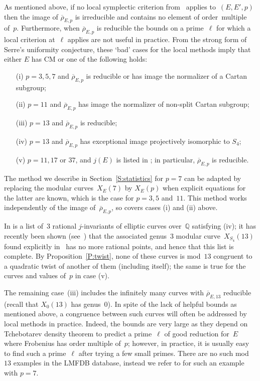 \documentclass[12pt]{amsart}
\newcommand{\Q}{\mathbb{Q}}
\newcommand{\rhobar}{{\overline{\rho}}}
\numberwithin{equation}{section}
\theoremstyle{definition}
\theoremstyle{remark}
\begin{document}

As mentioned above, if no local
symplectic criterion from~\cite{FKSym} applies to~$(E,E',p)$ then the image of $\rhobar_{E,p}$ is irreducible and contains no element of order~multiple of~$p$. Furthermore, 
when $\rhobar_{E,p}$ is reducible the bounds
on a prime~$\ell$ for which a local criterion at~$\ell$ 
applies are not useful in practice.
From the strong form of Serre's uniformity conjecture, these `bad' cases for the local methods imply that either $E$ has CM 
or one of the following holds:
\begin{itemize}
 \item[(i)] $p=3,5,7$ and $\rhobar_{E,p}$ is reducible or has image the normalizer of a Cartan subgroup;
 \item[(ii)] $p=11$ and $\rhobar_{E,p}$ has image the normalizer of non-split Cartan subgroup;
 \item[(iii)] $p=13$ and $\rhobar_{E,p}$ is reducible; 
 \item[(iv)] $p=13$ and $\rhobar_{E,p}$ has exceptional image projectively isomorphic to $S_4$;
 \item[(v)] $p=11,17$ or $37$, and $j(E)$ is listed
 in \cite[Table~2.1]{DahmenPhD}; in particular, $\rhobar_{E,p}$ is reducible.
\end{itemize}
The method we describe in Section~\ref{S:statistics} for $p=7$ can be
adapted by replacing the modular curves~$X_E(7)$ by $X_E(p)$ when
explicit equations for the latter are known, which is the case for
$p=3,5$ and~$11$. This method works independently of the image
of~$\rhobar_{E,p}$, so covers cases (i) and (ii) above.

In \cite[Corollary~1.9]{BarinderCrem} is a list of~$3$ rational
$j$-invariants of elliptic curves over~$\Q$ satisfying (iv); it has
recently been shown (see~\cite{BDMTV-S4}) that the associated
genus~$3$ modular curve~$X_{S_4}(13)$ found explicitly
in~\cite{BarinderCrem} has no more rational points, and hence that
this list is complete. By Proposition~\ref{P:twist}, none of these
curves is mod~$13$ congruent to a quadratic twist of another of them
(including itself); the same is true for the curves and values of~$p$
in case (v).

The remaining case~(iii) includes the infinitely many curves with
$\rhobar_{E,13}$ reducible (recall that $X_0(13)$ has genus~0). In
spite of the lack of helpful bounds as mentioned above, a congruence
between such curves will often be addressed by local methods in
practice. Indeed, the bounds are very large as they depend on
Tchebotarev density theorem to predict a prime~$\ell$ of good
reduction for~$E$ where Frobenius has order multiple of~$p$; however,
in practice, it is usually easy to find such a prime~$\ell$ after
trying a few small primes.  There are no such mod~$13$ examples in the
LMFDB database, instead we refer to \cite[Example~31.2]{FKSym} for
such an example with $p=7$.
\end{document}
